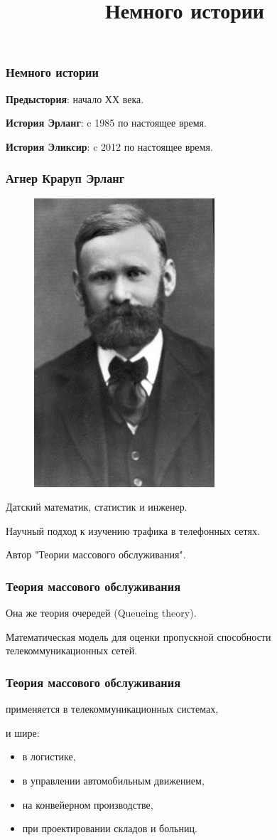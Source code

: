 \documentclass[10pt]{beamer}
\title{Немного истории}
\begin{document}
\begin{frame}
  \frametitle{Немного истории}
  \textbf{Предыстория}: начало ХХ века.
  \par \bigskip
  \textbf{История Эрланг}: c 1985 по настоящее время.
  \par \bigskip
  \textbf{История Эликсир}: c 2012 по настоящее время.
\end{frame}


\begin{frame}
  \frametitle{Агнер Краруп Эрланг}
  \begin{figure}
    \includegraphics{agner_krarup_erlang}
  \end{figure}
  Датский математик, статистик и инженер.
  \par \bigskip
  Научный подход к изучению трафика в телефонных сетях.
  \par \bigskip
  Автор "Теории массового обслуживания".
\end{frame}

\begin{frame}
  \frametitle{Теория массового обслуживания}
  Она же теория очередей (Queueing theory).
  \par \bigskip
  Математическая модель для оценки пропускной способности телекоммуникационных сетей.
\end{frame}

\begin{frame}
  \frametitle{Теория массового обслуживания}
  применяется в телекоммуникационных системах,
  \par \bigskip
  и шире:
  \begin{itemize}
  \item в логистике,
  \item в управлении автомобильным движением,
  \item на конвейерном производстве,
  \item при проектировании складов и больниц.
  \end{itemize}
\end{frame}
\end{document}
